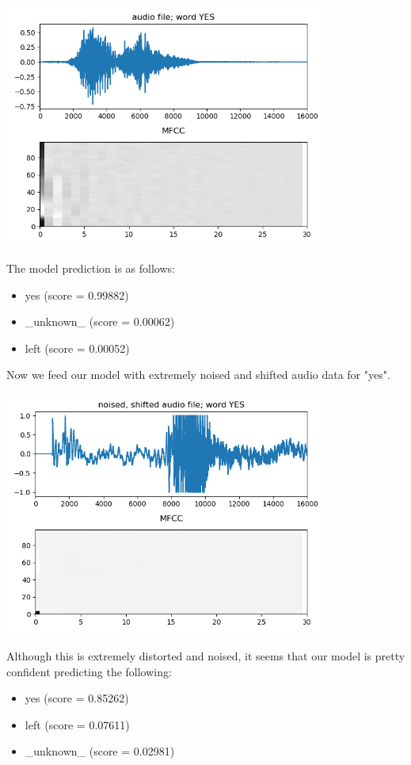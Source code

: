 \documentclass[twoside]{article}
\newenvironment{Figure}
  {\par\medskip\noindent\minipage{\linewidth}}
  {\endminipage\par\medskip}
\begin{document}
\begin{multicols}{2}
\begin{Figure}
	\centering
	\includegraphics[width=0.8\textwidth]{yes_clean}
	\label{img:yes-clean}
\end{Figure}

The model prediction is as follows:
\begin{itemize}
	\item yes (score = 0.99882)
	\item \_unknown\_ (score = 0.00062)
	\item left (score = 0.00052)
\end{itemize}

Now we feed our model with extremely noised and shifted audio data for "yes". 
\begin{Figure}
	\centering
	\includegraphics[width=0.8\textwidth]{yes_noised}
	\label{img:yes-noised}
\end{Figure}

Although this is extremely distorted and noised, it seems that our model is pretty confident predicting the following:
\begin{itemize}
	\item yes (score = 0.85262)
	\item left (score = 0.07611)
	\item \_unknown\_ (score = 0.02981)
\end{itemize}





\end{multicols}
\end{document}
